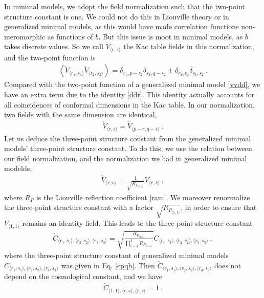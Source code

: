 \documentclass[12pt, a4paper, notitlepage, twoside]{report}
\numberwithin{equation}{section}
\theoremstyle{break}
\begin{document}
In minimal models, we adopt the field normalization such that the two-point structure constant is one. We could not do this in Liouville theory or in generalized minimal models, as this would have made correlation functions non-meromorphic as functions of $b$. But this issue is moot in minimal models, as $b$ takes discrete values. So we call $\check{V}_{\langle r,s\rangle}$ the Kac table fields in this normalization, and the two-point function is 
\begin{align}
 \boxed{\left\langle \check{V}_{\langle r_1,s_1 \rangle} \check{V}_{\langle r_2,s_2 \rangle} \right\rangle = \delta_{r_1,p-r_2}\delta_{s_1,q-s_2} + \delta_{r_1,r_2} \delta_{s_1,s_2}} \ .
\end{align}
Compared with the two-point function of a generalized minimal model \eqref{vvdd}, we have an extra term due to the identity \eqref{ddr}. This identity actually accounts for all coincidences of conformal dimensions in the Kac table. In our normalization, two fields with the same dimension are identical, 
\begin{align}
 \check{V}_{\langle r,s \rangle} = \check{V}_{\langle p-r,q-s \rangle}\ .
  \label{vvr}
\end{align}
Let us deduce the three-point structure constant from the generalized minimal models' three-point structure constant. To do this, we use the relation between our field normalization, and the normalization we had in generalized minimal modelds,
\begin{align}
 \check{V}_{\langle r,s \rangle} = \frac{1}{\sqrt{R_{P_{\langle r,s \rangle}}}} V_{\langle r,s \rangle}\ , 
\end{align}
where $R_P$ is the Liouville reflection coefficient \eqref{ram}. We moreover renormalize the three-point structure constant with a factor $\sqrt{R_{P_{\langle 1,1 \rangle}}}$, in order to ensure that $V_{\langle 1,1\rangle}$ remains an identity field. This leads to the three-point structure constant 
\begin{align}
 \check{C}_{\langle r_1,s_1\rangle ,\langle r_2,s_2\rangle ,\langle r_3,s_3 \rangle} = \sqrt{\frac{R_{P_{\langle 1,1 \rangle}}}{\prod_{i=1}^3 R_{P_{\langle r_i,s_i \rangle}}}}  C_{\langle r_1,s_1\rangle ,\langle r_2,s_2\rangle ,\langle r_3,s_3 \rangle}\ ,
\label{tcc}
\end{align}
where the three-point structure constant of generalized minimal models $C_{\langle r_1,s_1\rangle ,\langle r_2,s_2\rangle ,\langle r_3,s_3 \rangle}$ was given in Eq. \eqref{cpqb}. 
Then $\check{C}_{\langle r_1,s_1\rangle ,\langle r_2,s_2\rangle ,\langle r_3,s_3 \rangle}$ does not depend on the cosmological constant, and we have 
\begin{align}
\boxed{ \check{C}_{\langle 1,1\rangle , \langle r,s \rangle,\langle r,s \rangle}=1}\ .
\end{align}
\end{document}
